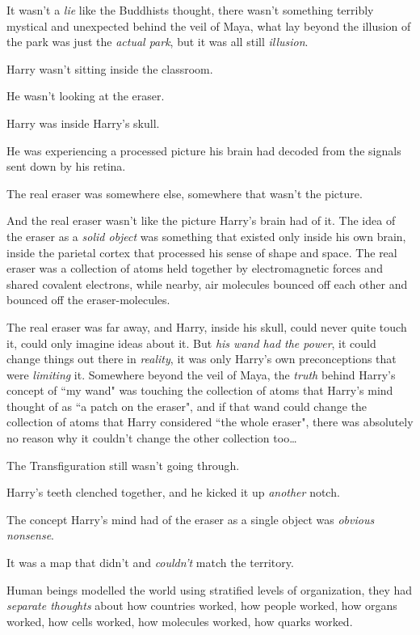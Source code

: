 It wasn't a \emph{lie} like the Buddhists thought, there wasn't something terribly mystical and unexpected behind the veil of Maya, what lay beyond the illusion of the park was just the \emph{actual park}, but it was all still \emph{illusion}.

Harry wasn't sitting inside the classroom.

He wasn't looking at the eraser.

Harry was inside Harry's skull.

He was experiencing a processed picture his brain had decoded from the signals sent down by his retina.

The real eraser was somewhere else, somewhere that wasn't the picture.

And the real eraser wasn't like the picture Harry's brain had of it. The idea of the eraser as a \emph{solid object} was something that existed only inside his own brain, inside the parietal cortex that processed his sense of shape and space. The real eraser was a collection of atoms held together by electromagnetic forces and shared covalent electrons, while nearby, air molecules bounced off each other and bounced off the eraser-molecules.

The real eraser was far away, and Harry, inside his skull, could never quite touch it, could only imagine ideas about it. But \emph{his wand had the power}, it could change things out there in \emph{reality}, it was only Harry's own preconceptions that were \emph{limiting} it. Somewhere beyond the veil of Maya, the \emph{truth} behind Harry's concept of ``my wand" was touching the collection of atoms that Harry's mind thought of as ``a patch on the eraser", and if that wand could change the collection of atoms that Harry considered ``the whole eraser", there was absolutely no reason why it couldn't change the other collection too{\ldots}

The Transfiguration still wasn't going through.

Harry's teeth clenched together, and he kicked it up \emph{another} notch.

The concept Harry's mind had of the eraser as a single object was \emph{obvious nonsense}.

It was a map that didn't and \emph{couldn't} match the territory.

Human beings modelled the world using stratified levels of organization, they had \emph{separate thoughts} about how countries worked, how people worked, how organs worked, how cells worked, how molecules worked, how quarks worked.

